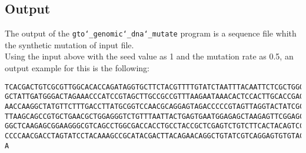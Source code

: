 \subsection*{Output}
The output of the \texttt{gto\char`_genomic\char`_dna\char`_mutate} program is a sequence file whith the synthetic mutation of input file.\\
Using the input above with the seed value as 1 and the mutation rate as 0.5, an output example for this is the following:
\begin{lstlisting}
TCACGACTGTCGCGTTGGCACACCAGATAGGTGCTTCTACGTTTTGTATCTAATTTACAATTCTCGCTGGGAGTTCATTC
GCTATTGATGGGACTAGAAACCCATCCGTAGCTTGCCGCCGTTTAAGAATAAACACTCCACTTGCACCGAGACGTAGCGC
AACCAAGGCTATGTTCTTTGACCTTATGCGGTCCAACGCAGGAGTAGACCCCCGTAGTTAGGTACTATCGCAGAATAGGC
TTAAGCAGCCGTGCTGAACGCTGGAGGGTCTGTTTAATTACTGAGTGAATGGAGAGCTAAGAGTTCGGAGCACCGCACGA
GGCTCAAGAGCGGAAGGGCGTCAGCCTGGCGACCACCTGCCTACCGCTCGAGTCTGTCTTCACTACAGTCCGTGGAGGAC
CCCCAACGACCTAGTATCCTACAAAGCCGCATACGACTTACAGAACAGGCTGTATCGTCAGGAGTGTGTACACGAAGAGT
A
\end{lstlisting}
